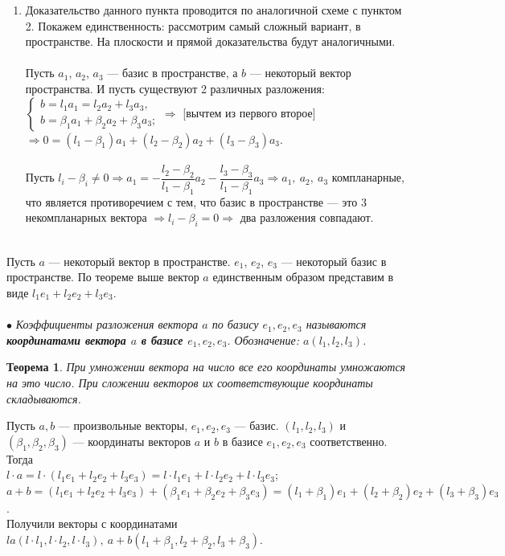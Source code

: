 \begin{Proof}
\begin{enumerate}
		\item Доказательство данного пункта проводится по аналогичной схеме с пунктом 2. Покажем единственность: рассмотрим самый сложный вариант, в пространстве. На плоскости и прямой доказательства будут аналогичными.\\\\
		Пусть $a_1$, $a_2$, $a_3$ --- базис в пространстве, а $b$ --- некоторый вектор пространства. И пусть существуют 2 различных разложения:
		$\begin{cases}
			b = l_1 a_1 = l_2 a_2 + l_3 a_3,\\
			b = \beta_1 a_1 + \beta_2 a_2 + \beta_3 a _3;
		\end{cases}\Rightarrow$ [вычтем из первого второе] $\Rightarrow 0 = (l_1 - \beta_1) a_1 + (l_2 - \beta_2) a_2 + (l_3 - \beta_3) a_3$.\\\\
		Пусть $l_i - \beta_i\ne 0\Rightarrow a_1 = -\dfrac{l_2 - \beta_2}{l_1 - \beta_1}a_2 -\dfrac{l_3 - \beta_3}{l_1 - \beta_1}a_3\Rightarrow a_1,\ a_2,\ a_3$ компланарные, что является противоречием с тем, что базис в пространстве --- это 3 некомпланарных вектора $\Rightarrow l_i - \beta_i = 0\Rightarrow$ два разложения совпадают.
\end{enumerate}\end{Proof}\\
Пусть $a$ --- некоторый вектор в пространстве. $e_1$, $e_2$, $e_3$ --- некоторый базис в пространстве. По теореме выше вектор $a$ единственным образом представим в виде $l_1 e_1 + l_2 e_2 + l_3 e_3$.\\\\
$\bullet$ \textit{Коэффициенты разложения вектора $a$ по базису $e_1, e_2, e_3$ называются \textbf{координатами вектора $a$ в базисе $e_1, e_2, e_3$}. Обозначение: $a(l_1, l_2, l_3)$.}
\newtheorem*{th2_2_2}{Теорема}\begin{th2_2_2}
	При умножении вектора на число все его координаты умножаются на это число. При
	сложении векторов их соответствующие координаты складываются.
\end{th2_2_2}\begin{Proof}
	Пусть $a, b$ --- произвольные векторы, $e_1, e_2, e_3$ --- базис. $(l_1, l_2, l_3)$ и $(\beta_1, \beta_2, \beta_3)$ --- координаты векторов $a$ и $b$ в базисе $e_1, e_2, e_3$ соответственно. Тогда\\
	$l\cdot a = l\cdot(l_1 e_1 + l_2 e_2 + l_3 e_3) = l\cdot l_1 e_1 + l\cdot l_2 e_2 + l\cdot l_3 e_3$;\\
	$a+b = (l_1 e_1 + l_2 e_2 + l_3 e_3) + (\beta_1 e_1 + \beta_2 e_2 + \beta_3 e_3) = (l_1 + \beta_1) e_1 + (l_2 + \beta_2) e_2 + (l_3 + \beta_3) e_3$.\\
	Получили векторы с координатами $la(l\cdot l_1, l\cdot l_2, l\cdot l_3),\ a+b(l_1 + \beta_1, l_2 + \beta_2, l_3 + \beta_3)$.
\end{Proof}
